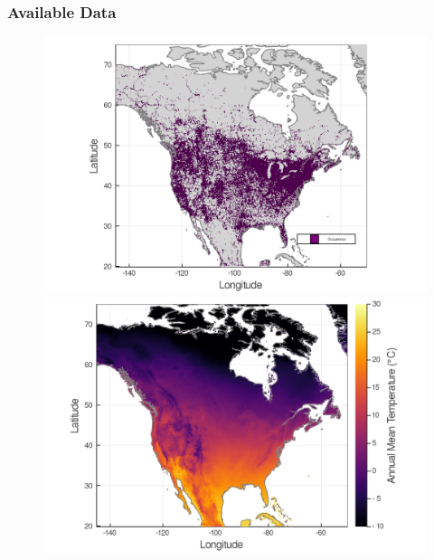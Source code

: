 \documentclass[10pt]{beamer}
\begin{document}
\begin{frame}
  \frametitle{Available Data}
  \begin{figure}
    \centering
    \hspace*{-0.5cm}\includegraphics[scale=0.08]{fig/01_raw_singlesp.png}
    \hspace*{0.5cm}\includegraphics[scale=0.08]{fig/wc_temp.png}
  \end{figure}
\end{frame}
\end{document}
